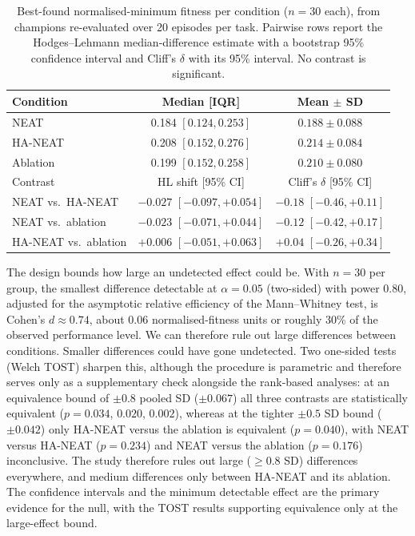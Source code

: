 \documentclass[12pt]{article}
\begin{document}
\begin{table}[h]
\centering
\caption{Best-found normalised-minimum fitness per condition ($n = 30$ each), from champions re-evaluated over 20 episodes per task. Pairwise rows report the Hodges--Lehmann median-difference estimate with a bootstrap 95\% confidence interval and Cliff's $\delta$ with its 95\% interval. No contrast is significant.}
\label{tab:main-fitness}
\begin{tabular}{lcc}
\toprule
Condition & Median [IQR] & Mean $\pm$ SD \\
\midrule
NEAT & 0.184 $[0.124, 0.253]$ & $0.188 \pm 0.088$ \\
HA-NEAT & 0.208 $[0.152, 0.276]$ & $0.214 \pm 0.084$ \\
Ablation & 0.199 $[0.152, 0.258]$ & $0.210 \pm 0.080$ \\
\midrule
Contrast & HL shift [95\% CI] & Cliff's $\delta$ [95\% CI] \\
\midrule
NEAT vs.\ HA-NEAT & $-0.027$ $[-0.097, +0.054]$ & $-0.18$ $[-0.46, +0.11]$ \\
NEAT vs.\ ablation & $-0.023$ $[-0.071, +0.044]$ & $-0.12$ $[-0.42, +0.17]$ \\
HA-NEAT vs.\ ablation & $+0.006$ $[-0.051, +0.063]$ & $+0.04$ $[-0.26, +0.34]$ \\
\bottomrule
\end{tabular}
\end{table}

The design bounds how large an undetected effect could be.
With $n = 30$ per group, the smallest difference detectable at $\alpha = 0.05$ (two-sided) with power 0.80, adjusted for the asymptotic relative efficiency of the Mann--Whitney test, is Cohen's $d \approx 0.74$, about 0.06 normalised-fitness units or roughly 30\% of the observed performance level.
We can therefore rule out large differences between conditions. Smaller differences could have gone undetected.
Two one-sided tests (Welch TOST) sharpen this, although the procedure is parametric and therefore serves only as a supplementary check alongside the rank-based analyses: at an equivalence bound of $\pm 0.8$ pooled SD ($\pm 0.067$) all three contrasts are statistically equivalent ($p = 0.034$, $0.020$, $0.002$), whereas at the tighter $\pm 0.5$ SD bound ($\pm 0.042$) only HA-NEAT versus the ablation is equivalent ($p = 0.040$), with NEAT versus HA-NEAT ($p = 0.234$) and NEAT versus the ablation ($p = 0.176$) inconclusive.
The study therefore rules out large ($\geq 0.8$ SD) differences everywhere, and medium differences only between HA-NEAT and its ablation. The confidence intervals and the minimum detectable effect are the primary evidence for the null, with the TOST results supporting equivalence only at the large-effect bound.
\end{document}

